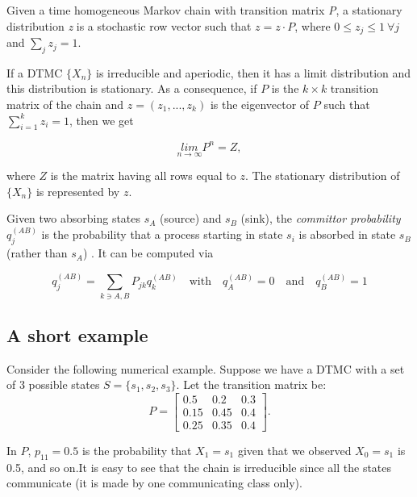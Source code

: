 \documentclass[article,nojss]{jss}
\begin{document}
Given a time homogeneous Markov chain with transition matrix \emph{P}, a stationary distribution \emph{z} is a stochastic row vector such that \(z=z\cdot P\), where \(0\leq z_{j}\leq 1 \: \forall j\) and \(\sum_{j}z_{j}=1\).

If a DTMC \(\{X_{n}\}\) is irreducible and aperiodic, then it has a limit distribution and this distribution is stationary. As a consequence, if \(P\) is the \(k\times k\) transition matrix of the chain and \(z=\left(z_{1},...,z_{k}\right)\) is the eigenvector of \(P\) such that \(\sum_{i=1}^{k}z_{i}=1\), then we get

\begin{equation}
  \underset{n\rightarrow\infty}{lim}P^{n}=Z,
  \label{eq:limMc}
\end{equation}

where \(Z\) is the matrix having all rows equal to \(z\). The stationary distribution of \(\{X_{n}\}\) is represented by \(z\).

Given two absorbing states \(s_A\) (source) and \(s_B\) (sink), the \emph{committor probability} \(q_j^{(AB)}\) is the probability that a process starting in state \(s_i\) is absorbed in state \(s_B\) (rather than \(s_A\)) \citep{noe_constructing_2009}. It can be computed via

\begin{equation}
 q_j^{(AB)} = \sum_{k \ni {A, B}} P_{jk}q_k^{(AB)} \quad \mbox{with} \quad
 q_A^{(AB)} = 0 \quad \mbox{and} \quad  q_B^{(AB)} = 1
\end{equation}

\hypertarget{a-short-example}{%
\subsection{A short example}\label{a-short-example}}

Consider the following numerical example. Suppose we have a DTMC with a set of 3 possible states \(S=\{s_{1}, s_{2}, s_{3}\}\). Let the transition matrix be:
\begin{equation}
P=\left[\begin{array}{ccc}
0.5 & 0.2 & 0.3\\
0.15 & 0.45 & 0.4\\
0.25 & 0.35 & 0.4
\end{array}\right].
\label{eq:trPropExEx1}
\end{equation}

In \(P\), \(p_{11}=0.5\) is the probability that \(X_{1}=s_{1}\) given that we observed \(X_{0}=s_{1}\) is 0.5, and so on.It is easy to see that the chain is irreducible since all the states communicate (it is made by one communicating class only).
\end{document}
